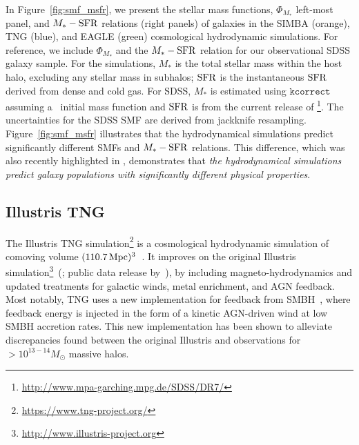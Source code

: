In Figure~\ref{fig:smf_msfr}, we present the stellar mass functions,
$\Phi_{M_*}$ left-most panel, and $M_*-{\rm SFR}$ relations (right panels) of
galaxies in the  SIMBA (orange), TNG (blue), and EAGLE (green) cosmological
hydrodynamic simulations.  For reference, we include $\Phi_{M_*}$ and the 
$M_*-{\rm SFR}$ relation for our observational SDSS galaxy sample. For the
simulations, $M_*$ is the total stellar mass within the host halo, excluding
any stellar mass in subhalos; ${\rm SFR}$ is the instantaneous ${\rm SFR}$ derived from
dense and cold gas. For SDSS, $M_*$ is estimated using $\mathtt{kcorrect}$~\citep{blanton2007a} 
assuming a~\cite{chabrier2003} initial mass function and ${\rm SFR}$ is from the
current release of \cite{brinchmann2004}\footnote{\url{http://www.mpa-garching.mpg.de/SDSS/DR7/}}.
The uncertainties for the SDSS SMF are derived from jackknife resampling.
Figure~\ref{fig:smf_msfr} illustrates that the hydrodynamical simulations
predict significantly different SMFs and $M_*-{\rm SFR}$ relations. 
This difference, which was also recently highlighted in \cite{hahn2019c}, 
demonstrates that \emph{the hydrodynamical simulations predict galaxy
populations with significantly different physical properties}.

\subsection{Illustris TNG} \label{sec:tng}
The Illustris TNG simulation\footnote{\url{https://www.tng-project.org/}}
is a cosmological hydrodynamic simulation of comoving volume 
$(110.7\,{\rm Mpc})^3$~\citep{nelson2018, pillepich2018, springel2018}. It improves on
the original Illustris simulation\footnote{\url{http://www.illustris-project.org}}~(\citealt{vogelsberger2014, genel2014};
public data release by~\citealt{nelson2015}), by including
magneto-hydrodynamics and updated treatments for galactic winds, metal
enrichment, and AGN feedback. Most notably, TNG uses a new implementation for
feedback from SMBH~\citep{weinberger2018}, where feedback energy is injected in
the form of a kinetic AGN-driven wind at low SMBH accretion rates. This new
implementation has been shown to alleviate discrepancies found between the
original Illustris and observations for $> 10^{13-14} M_\odot$ massive halos. 

